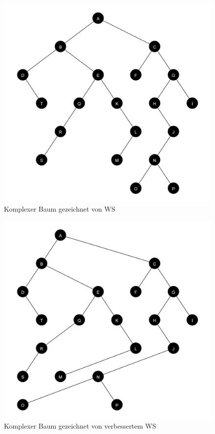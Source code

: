 \begin{figure}[ht]
    \centering
    \includegraphics[scale = 0.12]{abbildungen/komplex_a2}
    \caption{Komplexer Baum gezeichnet von WS}
\end{figure}

\begin{figure}[ht]
    \centering
    \includegraphics[scale = 0.12]{abbildungen/komplex_a2_v}
    \caption{Komplexer Baum gezeichnet von verbessertem WS}
\end{figure}


